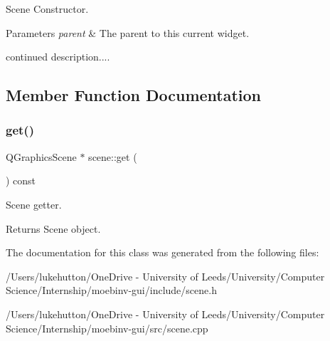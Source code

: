 Scene Constructor. 


\begin{DoxyParams}{Parameters}
{\em parent} & The parent to this current widget.\\
\hline
\end{DoxyParams}
continued description.... 

\subsection{Member Function Documentation}
\mbox{\label{classscene_a89ba3baf41de3ed6dc530f606d083987}} 
\subsubsection{\texorpdfstring{get()}{get()}}
{\footnotesize\ttfamily Q\+Graphics\+Scene $\ast$ scene\+::get (\begin{DoxyParamCaption}{ }\end{DoxyParamCaption}) const}



Scene getter. 

\begin{DoxyReturn}{Returns}
Scene object. 
\end{DoxyReturn}


The documentation for this class was generated from the following files\+:\begin{DoxyCompactItemize}
\item 
/\+Users/lukehutton/\+One\+Drive -\/ University of Leeds/\+University/\+Computer Science/\+Internship/moebinv-\/gui/include/scene.\+h\item 
/\+Users/lukehutton/\+One\+Drive -\/ University of Leeds/\+University/\+Computer Science/\+Internship/moebinv-\/gui/src/scene.\+cpp\end{DoxyCompactItemize}
